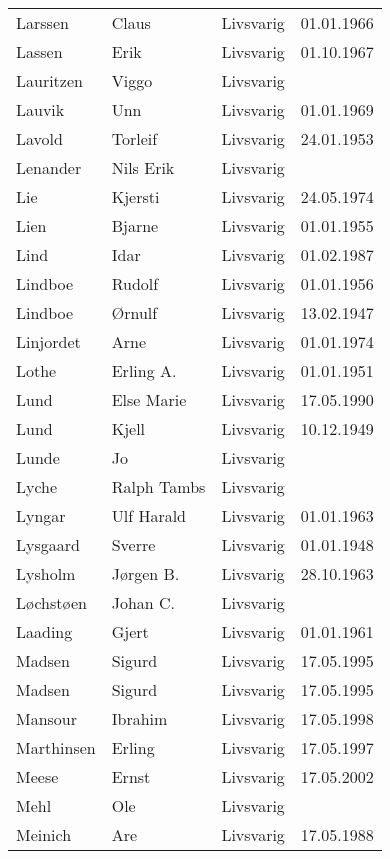 \begin{longtable}{llll}
        Larssen	&	Claus	&	Livsvarig 	&	01.01.1966	\\
        Lassen	&	Erik	&	Livsvarig 	&	01.10.1967	\\
        Lauritzen	&	Viggo	&	Livsvarig 	&		\\
        Lauvik	&	Unn	&	Livsvarig 	&	01.01.1969	\\
        Lavold	&	Torleif	&	Livsvarig 	&	24.01.1953	\\
        Lenander	&	Nils Erik	&	Livsvarig 	&		\\
        Lie	&	Kjersti	&	Livsvarig 	&	24.05.1974	\\
        Lien	&	Bjarne	&	Livsvarig 	&	01.01.1955	\\
        Lind	&	Idar	&	Livsvarig 	&	01.02.1987	\\
        Lindboe	&	Rudolf	&	Livsvarig 	&	01.01.1956	\\
        Lindboe	&	Ørnulf	&	Livsvarig 	&	13.02.1947	\\
        Linjordet	&	Arne	&	Livsvarig 	&	01.01.1974	\\
        Lothe	&	Erling A.	&	Livsvarig 	&	01.01.1951	\\
        Lund	&	Else Marie	&	Livsvarig 	&	17.05.1990	\\
        Lund	&	Kjell	&	Livsvarig 	&	10.12.1949	\\
        Lunde	&	Jo	&	Livsvarig 	&		\\
        Lyche	&	Ralph Tambs	&	Livsvarig 	&		\\
        Lyngar	&	Ulf Harald	&	Livsvarig 	&	01.01.1963	\\
        Lysgaard	&	Sverre	&	Livsvarig 	&	01.01.1948	\\
        Lysholm	&	Jørgen B.	&	Livsvarig 	&	28.10.1963	\\
        Løchstøen	&	Johan C.	&	Livsvarig 	&		\\
        Laading	&	Gjert	&	Livsvarig 	&	01.01.1961	\\
        Madsen	&	Sigurd	&	Livsvarig 	&	17.05.1995	\\
        Madsen 	&	Sigurd 	&	Livsvarig 	&	17.05.1995	\\
        Mansour 	&	Ibrahim	&	Livsvarig	&	17.05.1998	\\
        Marthinsen 	&	Erling	&	Livsvarig	&	17.05.1997	\\
        Meese 	&	Ernst	&	Livsvarig	&	17.05.2002	\\
        Mehl	&	Ole	&	Livsvarig 	&		\\
        Meinich	&	Are	&	Livsvarig 	&	17.05.1988	\\

\end{longtable}
